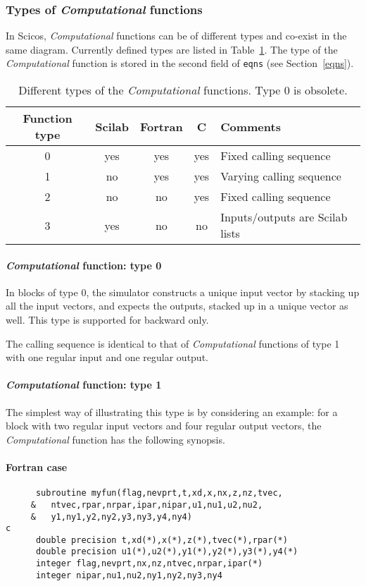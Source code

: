 \documentclass{article}
\newcommand{\computational}{{\em Computational }}
\begin{document}
\subsubsection{Types of \computational functions}
In Scicos, \computational functions can be of different types
and co-exist in the same diagram. Currently defined types are
listed in Table~\ref{tab1}. The type of the \computational function
is stored in the second field of {\tt eqns} (see Section~\ref{eqns}). 

\begin{table}[ht]
\begin{center}
\begin{tabular}{|c|c|c|c|l|} \hline
Function type& Scilab & Fortran & C & Comments \\ \hline
0 & yes & yes & yes & Fixed calling sequence \\
1 & no &  yes & yes & Varying calling sequence   \\
2 & no &  no  & yes & Fixed calling sequence  \\
3 & yes& no  &  no  & Inputs/outputs are Scilab lists\\ \hline
\end{tabular}
\caption{Different types of the \computational functions. 
Type $0$ is obsolete.}
\label{tab1}
\end{center}
\end{table}

\paragraph{\computational function: type 0}
In blocks of type 0, the simulator constructs a unique input vector by
stacking up all the input vectors, and expects the outputs, stacked up
in a unique vector as well. This type is supported for backward only.

The calling sequence is identical to that of \computational functions of type 1
with one regular input and one regular output.

\paragraph{\computational function: type 1}
The simplest way of illustrating this type is by considering
an example:
for a block with two regular input vectors and four regular output
vectors, the \computational function has the following synopsis.

\paragraph{Fortran case}
\begin{verbatim}
      subroutine myfun(flag,nevprt,t,xd,x,nx,z,nz,tvec,
     &   ntvec,rpar,nrpar,ipar,nipar,u1,nu1,u2,nu2,
     &   y1,ny1,y2,ny2,y3,ny3,y4,ny4)
c
      double precision t,xd(*),x(*),z(*),tvec(*),rpar(*)
      double precision u1(*),u2(*),y1(*),y2(*),y3(*),y4(*)
      integer flag,nevprt,nx,nz,ntvec,nrpar,ipar(*)
      integer nipar,nu1,nu2,ny1,ny2,ny3,ny4
\end{verbatim}
\end{document}
